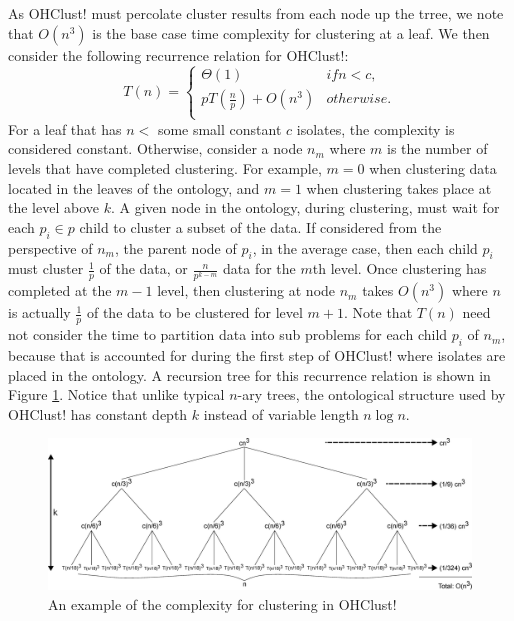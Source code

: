 \documentclass[12pt]{ucthesis}
\begin{document}
      As \textsf{OHClust!} must percolate cluster results from each node up the
      trree, we note that $O(n^{3})$ is the base case time complexity for
      clustering at a leaf. We then consider the following recurrence relation
      for \textsf{OHClust!}:
      $$
         T(n) = \begin{cases}
                  \Theta(1) & if n < c,\\
                  pT(\frac{n}{p}) + O(n^{3}) & otherwise.\\
                \end{cases}
      $$
      For a leaf that has $n <$ some small constant $c$ isolates, the
      complexity is considered constant. Otherwise, consider a node $n_{m}$
      where $m$ is the number of levels that have completed clustering. For
      example, $m=0$ when clustering data located in the leaves of the
      ontology, and $m=1$ when clustering takes place at the level above $k$.
      A given node in the ontology, during clustering, must wait for each
      $p_{i} \in p$ child to cluster a subset of the data. If considered from
      the perspective of $n_{m}$, the parent node of $p_{i}$, in the average
      case, then each child $p_{i}$ must cluster $\frac{1}{p}$ of the data, or
      $\frac{n}{p^{k-m}}$ data for the $m$th level. Once clustering has
      completed at the $m - 1$ level, then clustering at node $n_{m}$ takes
      $O(n^{3})$ where $n$ is actually $\frac{1}{p}$ of the data to be
      clustered for level $m + 1$. Note that $T(n)$ need not
      consider the time to partition data into sub problems for each child
      $p_{i}$ of $n_{m}$, because that is accounted for during the first step
      of \textsf{OHClust!} where isolates are placed in the ontology. A
      recursion tree for this recurrence relation is shown in Figure
      \ref{fig:recursion_tree}. Notice that unlike typical $n$-ary trees, the
      ontological structure used by \textsf{OHClust!} has constant depth $k$
      instead of variable length $n\log n$.

      \begin{figure}[t]
         \centering
         \includegraphics[width=\textwidth]{graphics/recursion_tree.eps}
         \caption{An example of the complexity for clustering in
                  \textsf{OHClust!}}
         \label{fig:recursion_tree}
      \end{figure}
\end{document}
